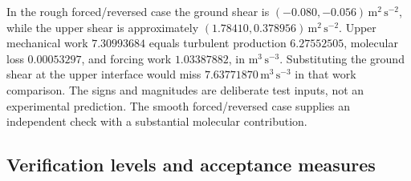 \documentclass[11pt,a4paper]{article}
\numberwithin{equation}{section}
\begin{document}
In the rough forced/reversed case the ground shear is
$(-0.080,-0.056)\,\mathrm{m^2\,s^{-2}}$, while the upper shear is
approximately $(1.78410,0.378956)\,\mathrm{m^2\,s^{-2}}$.
Upper mechanical work $7.30993684$ equals turbulent production
$6.27552505$, molecular loss $0.00053297$, and forcing work
$1.03387882$, in $\mathrm{m^3\,s^{-3}}$.
Substituting the ground shear at the upper interface would miss
$7.63771870\,\mathrm{m^3\,s^{-3}}$ in that work comparison.
The signs and magnitudes are deliberate test inputs, not an
experimental prediction.  The smooth forced/reversed case supplies
an independent check with a substantial molecular contribution.

\subsection{Verification levels and acceptance measures}
\label{num:evidence-levels}
\end{document}
